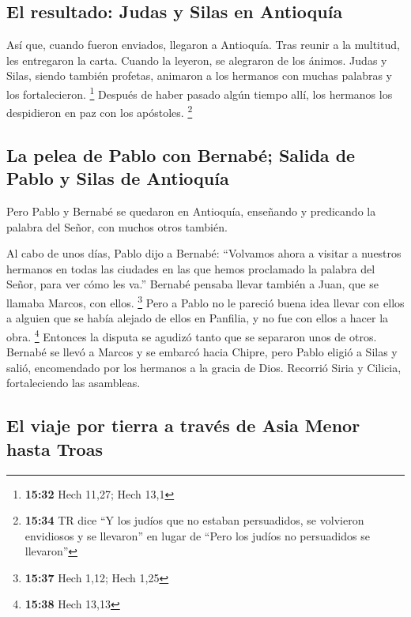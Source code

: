 \hypertarget{el-resultado-judas-y-silas-en-antioquuxeda}{%
\subsection{El resultado: Judas y Silas en
Antioquía}\label{el-resultado-judas-y-silas-en-antioquuxeda}}

 Así que, cuando fueron enviados, llegaron a Antioquía.
Tras reunir a la multitud, les entregaron la carta. 
Cuando la leyeron, se alegraron de los ánimos.  Judas y
Silas, siendo también profetas, animaron a los hermanos con muchas
palabras y los fortalecieron. \footnote{\textbf{15:32} Hech 11,27; Hech
  13,1}  Después de haber pasado algún tiempo allí, los
hermanos los despidieron en paz con los apóstoles. 
\footnote{\textbf{15:34} TR dice ``Y los judíos que no estaban
  persuadidos, se volvieron envidiosos y se llevaron'' en lugar de
  ``Pero los judíos no persuadidos se llevaron''}

\hypertarget{la-pelea-de-pablo-con-bernabuxe9-salida-de-pablo-y-silas-de-antioquuxeda}{%
\subsection{La pelea de Pablo con Bernabé; Salida de Pablo y Silas de
Antioquía}\label{la-pelea-de-pablo-con-bernabuxe9-salida-de-pablo-y-silas-de-antioquuxeda}}

 Pero Pablo y Bernabé se quedaron en Antioquía, enseñando
y predicando la palabra del Señor, con muchos otros también.

 Al cabo de unos días, Pablo dijo a Bernabé: ``Volvamos
ahora a visitar a nuestros hermanos en todas las ciudades en las que
hemos proclamado la palabra del Señor, para ver cómo les va.''
 Bernabé pensaba llevar también a Juan, que se llamaba
Marcos, con ellos. \footnote{\textbf{15:37} Hech 1,12; Hech 1,25}
 Pero a Pablo no le pareció buena idea llevar con ellos a
alguien que se había alejado de ellos en Panfilia, y no fue con ellos a
hacer la obra. \footnote{\textbf{15:38} Hech 13,13} 
Entonces la disputa se agudizó tanto que se separaron unos de otros.
Bernabé se llevó a Marcos y se embarcó hacia Chipre, 
pero Pablo eligió a Silas y salió, encomendado por los hermanos a la
gracia de Dios.  Recorrió Siria y Cilicia, fortaleciendo
las asambleas.

\hypertarget{el-viaje-por-tierra-a-travuxe9s-de-asia-menor-hasta-troas}{%
\subsection{El viaje por tierra a través de Asia Menor hasta
Troas}\label{el-viaje-por-tierra-a-travuxe9s-de-asia-menor-hasta-troas}}

